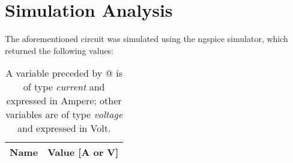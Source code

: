 \section{Simulation Analysis}
\label{sec:simulation}

\par
The aforementioned circuit was simulated using the ngspice simulator, which returned the following values:
\par

\begin{table}[h]
  \centering
  \begin{tabular}{|l|r|}
    \hline    
    {\bf Name} & {\bf Value [A or V]} \\ \hline
    
  \end{tabular}
  \caption{A variable preceded by @ is of type {\em current} and expressed in Ampere; other variables are of type {\it voltage} and expressed in Volt.}
  \label{tab:sim}
\end{table}



